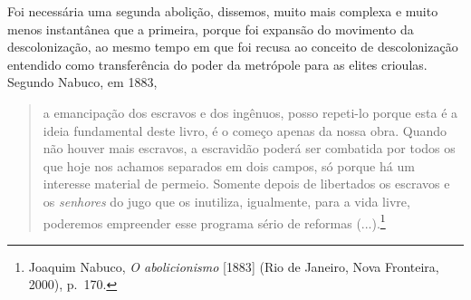 Foi necessária uma segunda abolição, dissemos, muito mais complexa e
muito menos instantânea que a primeira, porque foi expansão do movimento
da descolonização, ao mesmo tempo em que foi recusa ao conceito de
descolonização entendido como transferência do poder da metrópole para
as elites crioulas. Segundo Nabuco, em 1883,

\begin{quote}
a emancipação dos escravos e dos ingênuos, posso repeti-lo porque esta é
a ideia fundamental deste livro, é o começo apenas da nossa obra. Quando
não houver mais escravos, a escravidão poderá ser combatida por todos os
que hoje nos achamos separados em dois campos, só porque há um interesse
material de permeio. Somente depois de libertados os escravos e os
\emph{senhores} do jugo que os inutiliza, igualmente, para a vida livre,
poderemos empreender esse programa sério de reformas (...).\footnote{Joaquim
  Nabuco, \emph{O abolicionismo} {[}1883{]} (Rio de Janeiro, Nova
  Fronteira, 2000), p.~170.}
\end{quote}

